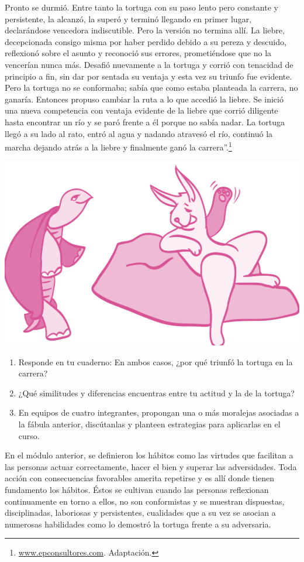 \documentclass[10pt,twoside]{article}
\begin{document}
Pronto se durmió. Entre tanto la tortuga con su paso lento pero
constante y persistente, la alcanzó, la superó y terminó llegando en
primer lugar, declarándose vencedora indiscutible. Pero la versión
no termina allí. La liebre, decepcionada consigo misma por haber
perdido debido a su pereza y descuido, reflexionó sobre el asunto
y reconoció sus errores, prometiéndose que no la vencerían nunca
más. Desafió nuevamente a la tortuga y corrió con tenacidad de
principio a fin, sin dar por sentada su ventaja y esta vez su triunfo fue
evidente. Pero la tortuga no se conformaba; sabía que como estaba
planteada la carrera, no ganaría. Entonces propuso cambiar la ruta a
lo que accedió la liebre. Se inició una nueva competencia con ventaja
evidente de la liebre que corrió diligente hasta encontrar un río y se
paró frente a él porque no sabía nadar. La tortuga llegó a su lado
al rato, entró al agua y nadando atravesó el río, continuó la marcha
dejando atrás a la liebre y finalmente ganó la carrera”.\footnote{\url{www.epconsultores.com}. Adaptación.
}
\begin{center}
\includegraphics[scale=.65]{Images/liebra_tortuga.png} 
\end{center}
\begin{enumerate}
\item Responde en tu cuaderno: En ambos casos,
¿por qué triunfó la tortuga en la carrera?
\item ¿Qué similitudes y diferencias encuentras
entre tu actitud y la de la tortuga?
\item En equipos de cuatro integrantes, propongan
una o más moralejas asociadas a la fábula
anterior, discútanlas y planteen estrategias
para aplicarlas en el curso.
\end{enumerate}
En el módulo anterior, se definieron los hábitos como las virtudes
que facilitan a las personas actuar correctamente, hacer el bien
y superar las adversidades. Toda acción con consecuencias
favorables amerita repetirse y es allí donde tienen fundamento
los hábitos. Éstos se cultivan cuando las personas reflexionan
continuamente en torno a ellos, no son conformistas y se
muestran dispuestas, disciplinadas, laboriosas y persistentes,
cualidades que a su vez se asocian a numerosas habilidades como
lo demostró la tortuga frente a su adversaria.
\end{document}
